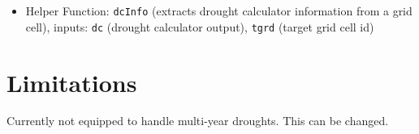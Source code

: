 \documentclass[11pt]{article}
\begin{document}
\begin{itemize}	
\item Helper Function: \verb!dcInfo! (extracts drought calculator information from a grid cell), inputs: \verb!dc! (drought calculator output), \verb!tgrd! (target grid cell id)
\end{itemize}



\section{Limitations}
Currently not equipped to handle multi-year droughts. This can be changed. 
\end{document}

